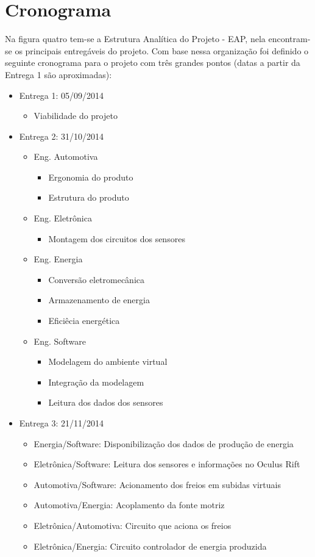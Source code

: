 \section{Cronograma}
Na figura quatro tem-se a Estrutura Analítica do Projeto - EAP, nela encontram-se os principais entregáveis do projeto. Com base nessa organização foi definido o seguinte cronograma para o projeto com três grandes pontos (datas a partir da Entrega 1 são aproximadas):
\begin{itemize}
  \item Entrega 1: 05/09/2014
    \begin{itemize}
      \item Viabilidade do projeto
    \end{itemize}
  \item Entrega 2: 31/10/2014
    \begin{itemize}
      \item Eng. Automotiva
        \begin{itemize}
          \item Ergonomia do produto
          \item Estrutura do produto
        \end{itemize}
      \item Eng. Eletrônica
        \begin{itemize}
          \item Montagem dos circuitos dos sensores
        \end{itemize}
      \item Eng. Energia
        \begin{itemize}
          \item Conversão eletromecânica
          \item Armazenamento de energia
          \item Eficiêcia energética
        \end{itemize}
      \item Eng. Software
        \begin{itemize}
          \item Modelagem do ambiente virtual
          \item Integração da modelagem
          \item Leitura dos dados dos sensores
        \end{itemize}
    \end{itemize}
  \item Entrega 3: 21/11/2014
    \begin{itemize}
      \item Energia/Software: Disponibilização dos dados de produção de energia
      \item Eletrônica/Software: Leitura dos sensores e informações no Oculus Rift
      \item Automotiva/Software: Acionamento dos freios em subidas virtuais
      \item Automotiva/Energia: Acoplamento da fonte motriz
      \item Eletrônica/Automotiva: Circuito que aciona os freios
      \item Eletrônica/Energia: Circuito controlador de energia produzida
    \end{itemize}
\end{itemize}
